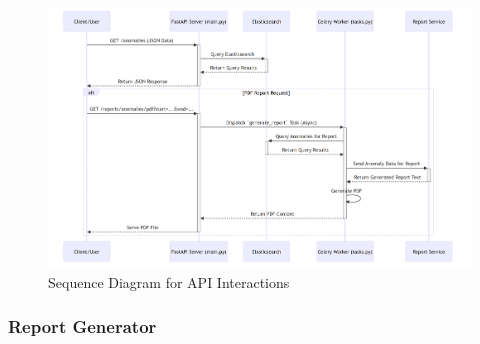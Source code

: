 
\begin{figure}[H]
    \centering
    \includegraphics[width=1.2\textwidth,angle=90]{figures/api-1.png}
    \caption{Sequence Diagram for API Interactions}
    \label{fig:class_diagram_data_model}
\end{figure}




\subsubsection{Report Generator}


